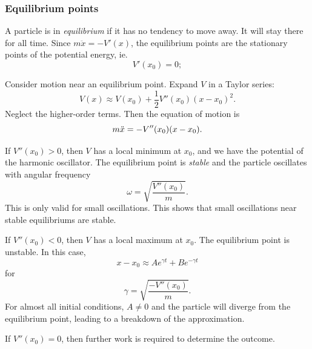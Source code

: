 \documentclass[a4paper]{article}
\begin{document}
\subsubsection{Equilibrium points}
\begin{defi}
  A particle is in \emph{equilibrium} if it has no tendency to move away. It will stay there for all time. Since $m\ddot{x} = -V'(x)$, the equilibrium points are the stationary points of the potential energy, ie.
  \[
    V'(x_0) = 0;
  \]
\end{defi}

Consider motion near an equilibrium point. Expand $V$ in a Taylor series:
\[
  V(x) \approx V(x_0) + \frac{1}{2}V''(x_0)(x - x_0)^2.
\]
Neglect the higher-order terms. Then the equation of motion is 
\[
  m\ddot{x} = -V''(x_0)(x - x_0).\\
\]

If $V''(x_0) > 0$, then $V$ has a local minimum at $x_0$, and we have the potential of the harmonic oscillator. The equilibrium point is \emph{stable} and the particle oscillates with angular frequency
\[
  \omega = \sqrt{\frac{V''(x_0)}{m}}.
\]
This is only valid for small oscillations. This shows that small oscillations near stable equilibriums are stable.

If $V''(x_0) < 0$, then $V$ has a local maximum at $x_0$. The equilibrium point is unstable. In this case,
\[
  x - x_0 \approx Ae^{\gamma t} + Be^{-\gamma t}
\]
for
\[
  \gamma = \sqrt{\frac{-V''(x_0)}{m}}.
\]
For almost all initial conditions, $A \not= 0$ and the particle will diverge from the equilibrium point, leading to a breakdown of the approximation.

If $V''(x_0) = 0$, then further work is required to determine the outcome.
\end{document}
